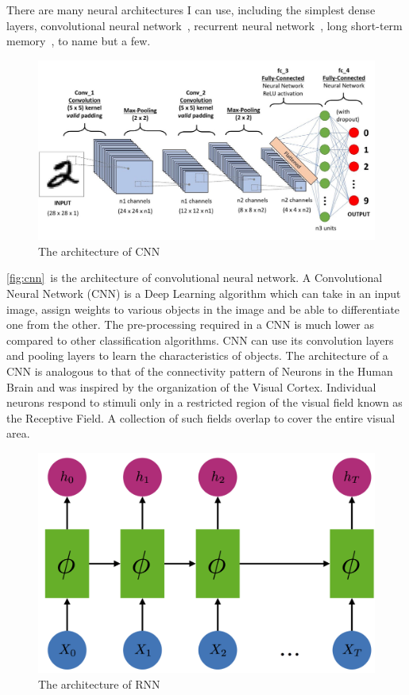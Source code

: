 There are many neural architectures I can use, including the simplest dense layers, convolutional neural network~\cite{albawi2017understanding}, recurrent neural network~\cite{tarwani2017survey}, long short-term memory~\cite{skovajsova2017long}, to name but a few.

\begin{figure}[ht]
\centering
\includegraphics[width=0.9\linewidth]{cnn-big}
\caption{The architecture of CNN}
\label{fig:cnn}
\end{figure}

\autoref{fig:cnn}~is the architecture of convolutional neural network.
A Convolutional Neural Network (CNN) is a Deep Learning algorithm which can take in an input image, assign weights to various objects in the image and be able to differentiate one from the other. The pre-processing required in a CNN is much lower as compared to other classification algorithms.
CNN can use its convolution layers and pooling layers to learn the characteristics of objects.
The architecture of a CNN is analogous to that of the connectivity pattern of Neurons in the Human Brain and was inspired by the organization of the Visual Cortex. Individual neurons respond to stimuli only in a restricted region of the visual field known as the Receptive Field. A collection of such fields overlap to cover the entire visual area.


\begin{figure}[ht]
\centering
\includegraphics[width=0.7\linewidth]{rnn-big}
\caption{The architecture of RNN}
\label{fig:rnn}
\end{figure}

